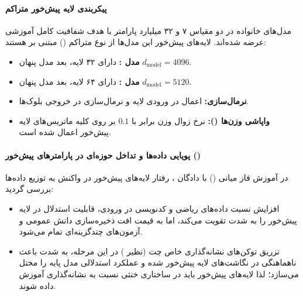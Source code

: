 \item {}

\paragraph*{پیکربندی لایه پیش‌خور متراکم}
مدل‌های خانواده  \cite{olmo2025olmo3} در دو مقیاس ۷ و ۳۲ میلیارد پارامتر با هدف شفافیت کامل آموزشی عرضه شده‌اند. لایه‌های پیش‌خور این مدل‌ها از نوع متراکم () مبتنی بر  هستند:
\begin{itemize}
    \item \textbf{مدل :} دارای ۳۲ لایه، بعد مدل پنهان $d_{\text{model}} = 4096$.
    \item \textbf{مدل :} دارای ۶۴ لایه، بعد مدل پنهان $d_{\text{model}} = 5120$.
    \item \textbf{نرمال‌سازی:} اعمال  در ورودی لایه و نرمال‌سازی در خروجی بلوک‌ها.
    \item \textbf{واپاشی وزن‌ها ():} نرخ زوال وزن برابر با $0.1$ بر روی کلیه ماتریس‌های لایه پیش‌خور اعمال شده است.
\end{itemize}

\paragraph*{پویایی داده‌ها و تداخل حوزه‌ای در پارامترهای پیش‌خور ()}
در آموزش فاز میانی () با دادگان ، رفتار لایه‌های پیش‌خور در واکنش به توزیع داده‌ها بررسی گردید:
\begin{itemize}
    \item افزایش نسبت داده‌های ریاضی و کدنویسی در ورودی، قابلیت استدلال در لایه پیش‌خور را به شدت تقویت می‌کند، اما به قیمت افت ذخیره‌سازی دانش عمومی و آزمون‌های چندگزینه‌ای تمام می‌شود.
    \item تزریق توکن‌های نشانه‌گذاری خاص چت (نظیر ) در این مرحله، به شدت باعث ناهماهنگی در نگاشت‌های لایه پیش‌خور شده و عملکرد استدلالی مدل پایه را مختل می‌سازد؛ لذا لایه‌های پیش‌خور باید در ساختاری خنثی نسبت به نشانه‌گذاری آموزش داده شوند.
\end{itemize}

